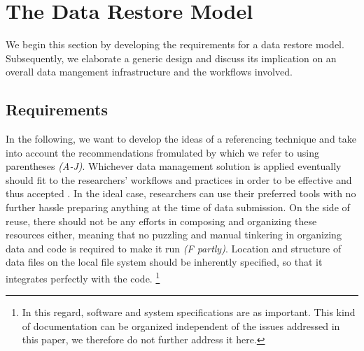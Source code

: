 \documentclass{acm_proc_article-sp}
\begin{document}
\section{The Data Restore Model}\label{sec:datareferencing}

We begin this section by developing the requirements for a data restore model.
Subsequently, we elaborate a generic design and discuss its implication on an overall data mangement infrastructure and the workflows involved.


\subsection{Requirements}\label{sec:req}

In the following, we want to develop the ideas of a referencing technique and take into account the recommendations fromulated by \cite{RePEc_ejw_journl_v_4_y_2007_i_3_p_326_337} which we refer to using parentheses \textit{(A-J)}.
Whichever data management solution is applied eventually should fit to the researchers' workflows and practices in order to be effective and thus accepted \cite{Feijen_2011}.
In the ideal case, researchers can use their preferred tools with no further hassle preparing anything at the time of data submission.
%
On the side of reuse, there should not be any efforts in composing and organizing these resources either, meaning that no puzzling and manual tinkering in organizing data and code is required to make it run \textit{(F partly)}.
Location and structure of data files on the local file system should be inherently specified, so that it integrates perfectly with the code.
\footnote{In this regard, software and system specifications are as important. This kind of documentation can be organized independent of the issues addressed in this paper, we therefore do not further address it here.}
  
\end{document}
